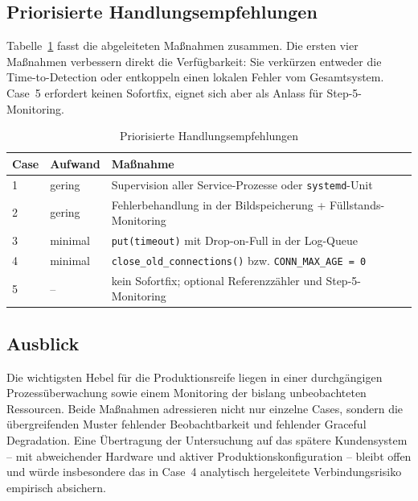\subsection{Priorisierte Handlungsempfehlungen}
\label{sec:fazit-empfehlungen}

Tabelle~\ref{tab:empfehlungen} fasst die abgeleiteten Maßnahmen zusammen. Die ersten vier
Maßnahmen verbessern direkt die Verfügbarkeit: Sie verkürzen entweder die
Time-to-Detection oder entkoppeln einen lokalen Fehler vom Gesamtsystem. Case~5 erfordert
keinen Sofortfix, eignet sich aber als Anlass für Step-5-Monitoring.

\begin{table}[htbp]
    \centering
    \caption{Priorisierte Handlungsempfehlungen}
    \label{tab:empfehlungen}
    \begin{tabularx}{\textwidth}{llX}
        \hline
        \textbf{Case} & \textbf{Aufwand} & \textbf{Maßnahme} \\
        \hline
        1 & gering   & Supervision aller Service-Prozesse oder \texttt{systemd}-Unit \\
        2 & gering   & Fehlerbehandlung in der Bildspeicherung + Füllstands-Monitoring \\
        3 & minimal  & \texttt{put(timeout)} mit Drop-on-Full in der Log-Queue \\
        4 & minimal  & \texttt{close\_old\_connections()} bzw. \texttt{CONN\_MAX\_AGE = 0} \\
        5 & --       & kein Sofortfix; optional Referenzzähler und Step-5-Monitoring \\
        \hline
    \end{tabularx}
\end{table}

\subsection{Ausblick}
\label{sec:fazit-ausblick}

Die wichtigsten Hebel für die Produktionsreife liegen in einer durchgängigen
Prozessüberwachung sowie einem Monitoring der bislang unbeobachteten Ressourcen. Beide
Maßnahmen adressieren nicht nur einzelne Cases, sondern die übergreifenden Muster
fehlender Beobachtbarkeit und fehlender Graceful Degradation. Eine
Übertragung der Untersuchung auf das spätere Kundensystem -- mit abweichender Hardware und
aktiver Produktionskonfiguration -- bleibt offen und würde insbesondere das in Case~4
analytisch hergeleitete Verbindungsrisiko empirisch absichern.
